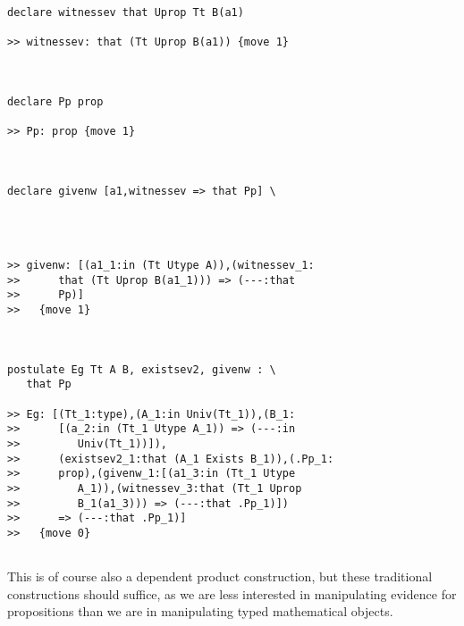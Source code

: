 \documentclass{article}
\begin{document}
\begin{verbatim}
declare witnessev that Uprop Tt B(a1)

>> witnessev: that (Tt Uprop B(a1)) {move 1}



declare Pp prop

>> Pp: prop {move 1}



declare givenw [a1,witnessev => that Pp] \
   



>> givenw: [(a1_1:in (Tt Utype A)),(witnessev_1:
>>      that (Tt Uprop B(a1_1))) => (---:that
>>      Pp)]
>>   {move 1}



postulate Eg Tt A B, existsev2, givenw : \
   that Pp

>> Eg: [(Tt_1:type),(A_1:in Univ(Tt_1)),(B_1:
>>      [(a_2:in (Tt_1 Utype A_1)) => (---:in
>>         Univ(Tt_1))]),
>>      (existsev2_1:that (A_1 Exists B_1)),(.Pp_1:
>>      prop),(givenw_1:[(a1_3:in (Tt_1 Utype
>>         A_1)),(witnessev_3:that (Tt_1 Uprop
>>         B_1(a1_3))) => (---:that .Pp_1)])
>>      => (---:that .Pp_1)]
>>   {move 0}


\end{verbatim}

This is of course also a dependent product construction, but these traditional constructions should suffice, as we are less interested in manipulating evidence for propositions than we are in manipulating typed mathematical objects.
\end{document}
